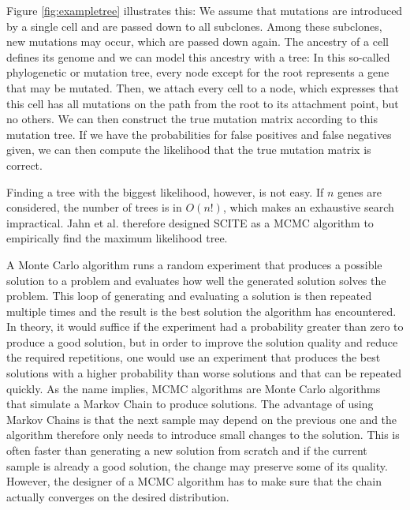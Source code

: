 Figure \ref{fig:exampletree} illustrates this: We assume that mutations are introduced by a single cell and are passed down to all subclones. Among these subclones, new mutations may occur, which are passed down again. The ancestry of a cell defines its genome and we can model this ancestry with a tree: In this so-called phylogenetic or mutation tree, every node except for the root represents a gene that may be mutated. Then, we attach every cell to a node, which expresses that this cell has all mutations on the path from the root to its attachment point, but no others. We can then construct the true mutation matrix according to this mutation tree. If we have the probabilities for false positives and false negatives given, we can then compute the likelihood that the true mutation matrix is correct. 


Finding a tree with the biggest likelihood, however, is not easy. If $n$ genes are considered, the number of trees is in $O(n!)$, which makes an exhaustive search impractical. Jahn et al. therefore designed \ac{SCITE} as a \ac{MCMC} algorithm to empirically find the maximum likelihood tree.


A Monte Carlo algorithm runs a random experiment that produces a possible solution to a problem and evaluates how well the generated solution solves the problem. This loop of generating and evaluating a solution is then repeated multiple times and the result is the best solution the algorithm has encountered. In theory, it would suffice if the experiment had a probability greater than zero to produce a good solution, but in order to improve the solution quality and reduce the required repetitions, one would use an experiment that produces the best solutions with a higher probability than worse solutions and that can be repeated quickly. As the name implies, \ac{MCMC} algorithms are Monte Carlo algorithms that simulate a Markov Chain to produce solutions. The advantage of using Markov Chains is that the next sample may depend on the previous one and the algorithm therefore only needs to introduce small changes to the solution. This is often faster than generating a new solution from scratch and if the current sample is already a good solution, the change may preserve some of its quality. However, the designer of a \ac{MCMC} algorithm has to make sure that the chain actually converges on the desired distribution.


